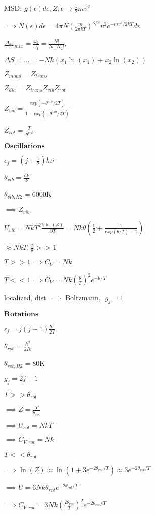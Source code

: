 \documentclass{article}
\begin{document}
\begin{multicols}{3}
MSD: $g(\epsilon)d\epsilon, Z, \epsilon \rightarrow \frac{1}{2}mv^2$

$\implies N(\epsilon)d\epsilon=4\pi N \left (\frac{m}{2\pi kT} \right )^{3/2} v^2 e^{-mv^2 /2kT}dv$

$\Delta\omega_{mix}=\frac{\omega_2}{\omega_1}=\frac{N!}{N_1! N_2!}$,

$\Delta S=...=-Nk(x_1 \ln(x_1) + x_2 \ln(x_2) )$

$Z_{mono}=Z_{trans}$

$Z_{dia }=Z_{trans}Z_{vib}Z_{rot}$

$Z_{vib }=\frac{exp(-\theta^{vib}/2T)}{1-exp(-\theta^{vib}/2T)}$

$Z_{rot }=\frac{T}{\theta^{rot}}$

$\textbf{Oscillations}$

$\epsilon_j=(j+\frac{1}{2})h\nu$

$\theta_{vib}=\frac{h\nu}{k}$

$\theta_{vib,H2}=6000$K

$\implies Z_{vib}$

$U_{vib}=NkT^2\frac{\partial \ln(Z)}{\partial T}=Nk\theta(\frac{1}{2}+\frac{1}{exp(\theta/T)-1})$

$\approx NkT, \frac{T}{\theta}>>1$

$T>>1 \implies C_V=Nk$

$T<<1 \implies C_V=Nk(\frac{\theta}{T})^2 e^{-\theta/T}$

localized, dist $\implies$ Boltzmann, $\:g_j=1$

$\textbf{Rotations}$

$\epsilon_j=j(j+1)\frac{\hbar^2}{2I}$

$\theta_{rot}=\frac{\hbar^2}{2Ik}$

$\theta_{rot,H2}=80$K

$g_j=2j+1$

$T>>\theta_{rot}$

$\implies Z=\frac{T}{\theta_{rot}}$

$\implies U_{rot}=NkT$

$\implies C_{V,rot}=Nk$

$T<<\theta_{rot}$

$\implies \ln(Z)\approx \ln(1+3e^{-2\theta_{rot}/T})\approx 3e^{-2\theta_{rot}/T}$

$\implies U=6Nk\theta_{rot}e^{-2\theta_{rot}/T}$

$\implies C_{V,rot}=3Nk(\frac{2\theta_{rot}}{T})^2 e^{-2\theta_{rot}/T}$


\end{multicols}
\end{document}
